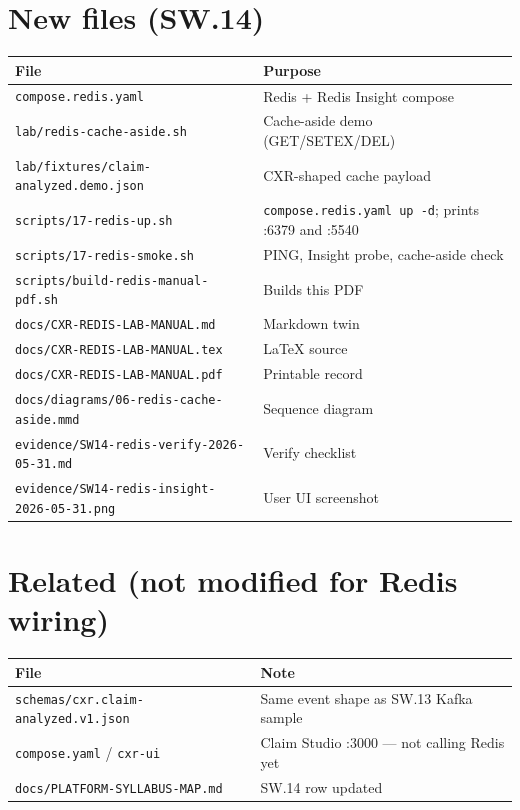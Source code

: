 \documentclass[11pt,a4paper]{report}
\begin{document}
\section{New files (SW.14)}

\begin{longtable}{@{}p{5cm}p{8cm}@{}}
\toprule
File & Purpose \\
\midrule
\endhead
\texttt{compose.redis.yaml} & Redis + Redis Insight compose \\
\texttt{lab/redis-cache-aside.sh} & Cache-aside demo (GET/SETEX/DEL) \\
\texttt{lab/fixtures/claim-analyzed.demo.json} & CXR-shaped cache payload \\
\texttt{scripts/17-redis-up.sh} & \texttt{compose.redis.yaml up -d}; prints :6379 and :5540 \\
\texttt{scripts/17-redis-smoke.sh} & PING, Insight probe, cache-aside check \\
\texttt{scripts/build-redis-manual-pdf.sh} & Builds this PDF \\
\texttt{docs/CXR-REDIS-LAB-MANUAL.md} & Markdown twin \\
\texttt{docs/CXR-REDIS-LAB-MANUAL.tex} & LaTeX source \\
\texttt{docs/CXR-REDIS-LAB-MANUAL.pdf} & Printable record \\
\texttt{docs/diagrams/06-redis-cache-aside.mmd} & Sequence diagram \\
\texttt{evidence/SW14-redis-verify-2026-05-31.md} & Verify checklist \\
\texttt{evidence/SW14-redis-insight-2026-05-31.png} & User UI screenshot \\
\bottomrule
\end{longtable}

\section{Related (not modified for Redis wiring)}

\begin{longtable}{@{}p{5cm}p{8cm}@{}}
\toprule
File & Note \\
\midrule
\endhead
\texttt{schemas/cxr.claim-analyzed.v1.json} & Same event shape as SW.13 Kafka sample \\
\texttt{compose.yaml} / \texttt{cxr-ui} & Claim Studio :3000 --- not calling Redis yet \\
\texttt{docs/PLATFORM-SYLLABUS-MAP.md} & SW.14 row updated \\
\bottomrule
\end{longtable}
\end{document}

